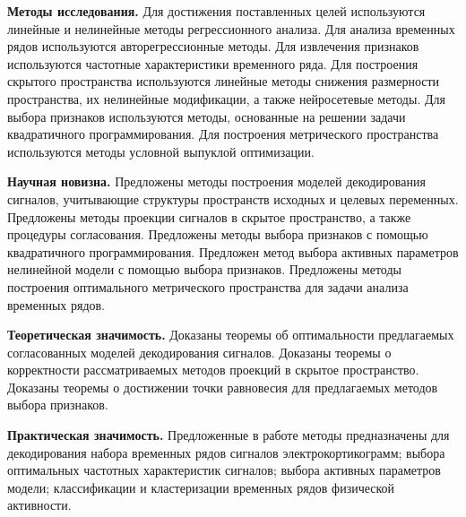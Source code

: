 \documentclass[11pt, a5paper]{dissert}
\begin{document}
\vspace{0.5cm}
\textbf{Методы исследования.}
Для достижения поставленных целей используются линейные и нелинейные методы регрессионного анализа.
Для анализа временных рядов используются авторегрессионные методы.
Для извлечения признаков используются частотные характеристики временного ряда.
Для построения скрытого пространства используются линейные методы снижения размерности пространства, их нелинейные модификации, а также нейросетевые методы.
Для выбора признаков используются методы, основанные на решении задачи квадратичного программирования.
Для построения метрического пространства используются методы условной выпуклой оптимизации.

\vspace{0.5cm}
\textbf{Научная новизна.}
Предложены методы построения моделей декодирования сигналов, учитывающие структуры пространств исходных и целевых переменных.
Предложены методы проекции сигналов в скрытое пространство, а также процедуры согласования.
Предложены методы выбора признаков с помощью квадратичного программирования.
Предложен метод выбора активных параметров нелинейной модели с помощью выбора признаков.
Предложены методы построения оптимального метрического пространства для задачи анализа временных рядов.

\vspace{0.5cm}
\textbf{Теоретическая значимость.}
Доказаны теоремы об оптимальности предлагаемых согласованных моделей декодирования сигналов.
Доказаны теоремы о корректности рассматриваемых методов проекций в скрытое пространство.
Доказаны теоремы о достижении точки равновесия для предлагаемых методов выбора признаков. 

\vspace{0.5cm}
\textbf{Практическая значимость.}
Предложенные в работе методы предназначены для декодирования набора временных рядов сигналов электрокортикограмм; выбора оптимальных частотных характеристик сигналов; выбора активных параметров модели; классификации и кластеризации временных рядов физической активности.
\end{document}
